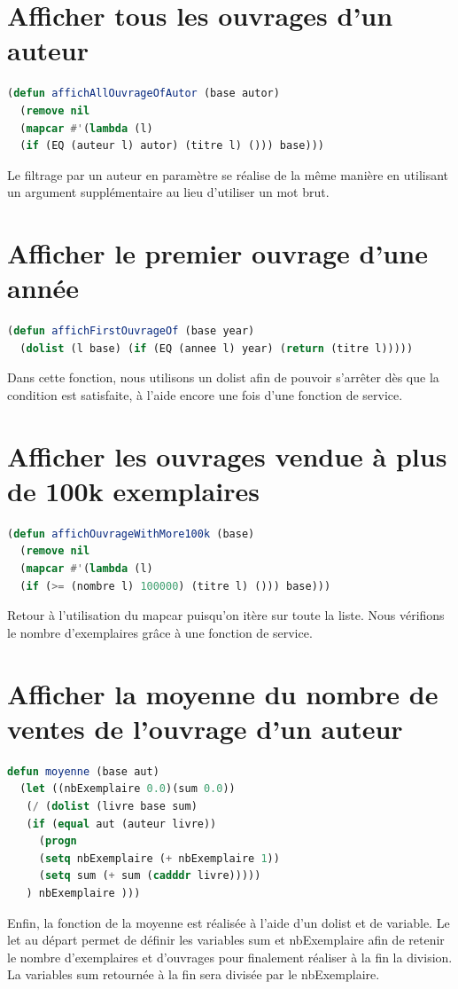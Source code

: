 \documentclass[a4paper,10pt]{report}
\begin{document}
\section{Afficher tous les ouvrages d'un auteur}	  
\begin{lstlisting}[language=Lisp]
(defun affichAllOuvrageOfAutor (base autor)
  (remove nil 
  (mapcar #'(lambda (l) 
  (if (EQ (auteur l) autor) (titre l) ())) base)))
\end{lstlisting}
Le filtrage par un auteur en paramètre se réalise de la même manière en utilisant un argument supplémentaire au lieu d’utiliser un mot brut.
\section{Afficher le premier ouvrage d'une année}	  

\begin{lstlisting}[language=Lisp]
(defun affichFirstOuvrageOf (base year)
  (dolist (l base) (if (EQ (annee l) year) (return (titre l)))))
\end{lstlisting}
Dans cette fonction, nous utilisons un dolist afin de pouvoir s’arrêter dès que la condition est satisfaite, à l’aide encore une fois d’une fonction de service.
\section{Afficher les ouvrages vendue à plus de 100k exemplaires}	  

\begin{lstlisting}[language=Lisp]
(defun affichOuvrageWithMore100k (base)
  (remove nil 
  (mapcar #'(lambda (l) 
  (if (>= (nombre l) 100000) (titre l) ())) base)))
\end{lstlisting}
Retour à l’utilisation du mapcar puisqu’on itère sur toute la liste. Nous vérifions le nombre d’exemplaires grâce à une fonction de service.\newpage
\section{Afficher la moyenne du nombre de ventes de l'ouvrage d'un auteur}	  
\begin{lstlisting}[language=Lisp]
defun moyenne (base aut)
  (let ((nbExemplaire 0.0)(sum 0.0))
   (/ (dolist (livre base sum)
   (if (equal aut (auteur livre))
     (progn 
     (setq nbExemplaire (+ nbExemplaire 1))
     (setq sum (+ sum (cadddr livre)))))
   ) nbExemplaire )))
\end{lstlisting}
Enfin, la fonction de la moyenne est réalisée à l’aide d’un dolist et de variable. Le let au départ permet de définir les variables sum et nbExemplaire afin de retenir le nombre d’exemplaires et d’ouvrages pour finalement réaliser à la fin la division. La variables sum retournée à la fin sera divisée par le nbExemplaire.

	  
	  
	  
	  
	  
	  
	  
	  
	  
	  
	  
\end{document}
